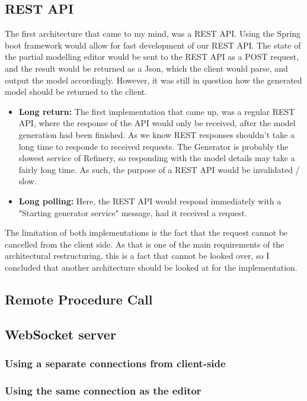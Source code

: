 \subsection{REST API}
The first architecture that came to my mind, was a REST API. Using the Spring boot framework would allow for fast development
of our REST API. The state of the partial modelling editor would be sent to the REST API as a POST request, and the result
would be returned as a Json, which the client would parse, and output the model accordingly. However, it was still in question
how the generated model should be returned to the client.
\begin{itemize}
        \item \textbf{Long return:}
		The first implementation that came up, was a regular REST API, where the response of the API would only be received, after
		the model generation had been finished. As we know REST responses shouldn't take a long time to responde to received requests.
		The Generator is probably the slowest service of Refinery, so responding with the model details may take a fairly long time.
		As such, the purpose of a REST API would be invalidated / slow.
		\item \textbf{Long polling:}
		Here, the REST API would respond immediately with a "Starting generator service" message, had it received a request.
\end{itemize}
The limitation of both implementations is the fact that the request cannot be cancelled from the client side. As that is one 
of the main requirements of the architectural restructuring, this is a fact that cannot be looked over, so I concluded that 
another architecture should be looked at for the implementation.


\subsection{Remote Procedure Call}

\subsection{WebSocket server}
\subsubsection{Using a separate connections from client-side}

\subsubsection{Using the same connection as the editor}
